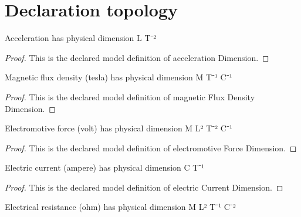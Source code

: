 \section{Declaration topology}
\begin{definition}
  \label{def:physics:phyx-mini-0981:phyxminiproblems-problemphyxmini0981-accelerationdimension}
  Acceleration has physical dimension L T⁻²
\end{definition}
\begin{proof}
  This is the declared model definition of acceleration Dimension.
\end{proof}
\begin{definition}
  \label{def:physics:phyx-mini-0981:phyxminiproblems-problemphyxmini0981-magneticfluxdensitydimension}
  Magnetic flux density (tesla) has physical dimension M T⁻¹ C⁻¹
\end{definition}
\begin{proof}
  This is the declared model definition of magnetic Flux Density Dimension.
\end{proof}
\begin{definition}
  \label{def:physics:phyx-mini-0981:phyxminiproblems-problemphyxmini0981-electromotiveforcedimension}
  Electromotive force (volt) has physical dimension M L² T⁻² C⁻¹
\end{definition}
\begin{proof}
  This is the declared model definition of electromotive Force Dimension.
\end{proof}
\begin{definition}
  \label{def:physics:phyx-mini-0981:phyxminiproblems-problemphyxmini0981-electriccurrentdimension}
  Electric current (ampere) has physical dimension C T⁻¹
\end{definition}
\begin{proof}
  This is the declared model definition of electric Current Dimension.
\end{proof}
\begin{definition}
  \label{def:physics:phyx-mini-0981:phyxminiproblems-problemphyxmini0981-electricalresistancedimension}
  Electrical resistance (ohm) has physical dimension M L² T⁻¹ C⁻²
\end{definition}
